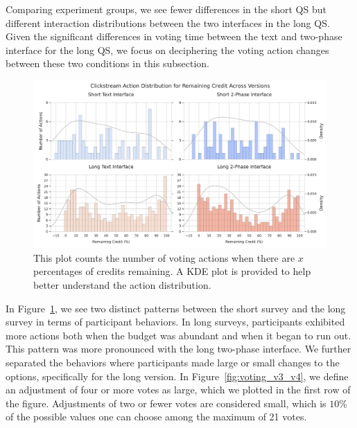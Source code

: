 Comparing experiment groups, we see fewer differences in the short QS but different interaction distributions between the two interfaces in the long QS. Given the significant differences in voting time between the text and two-phase interface for the long QS, we focus on deciphering the voting action changes between these two conditions in this subsection.

\begin{figure}[ht]
    \centering
    \includegraphics[width=\textwidth]{content/image/results/clickstream_action_distribution.pdf}
    \caption{This plot counts the number of voting actions when there are $x$ percentages of credits remaining. A KDE plot is provided to help better understand the action distribution.}
    \label{fig:voting_all}
\end{figure}

In Figure~\ref{fig:voting_all}, we see two distinct patterns between the short survey and the long survey in terms of participant behaviors. In long surveys, participants exhibited more actions both when the budget was abundant and when it began to run out. This pattern was more pronounced with the long two-phase interface. We further separated the behaviors where participants made large or small changes to the options, specifically for the long version. In Figure~\ref{fig:voting_v3_v4}, we define an adjustment of four or more votes as large, which we plotted in the first row of the figure. Adjustments of two or fewer votes are considered small, which is $10\%$ of the possible values one can choose among the maximum of 21 votes.

